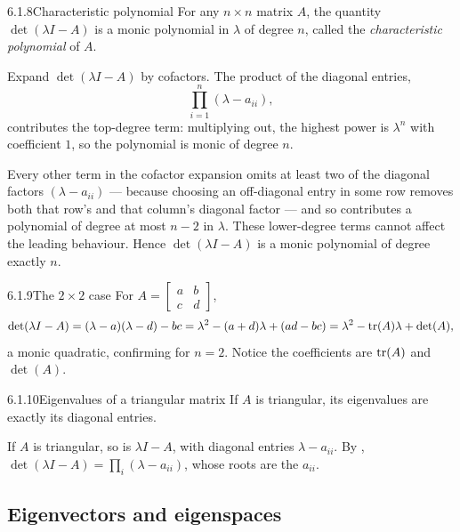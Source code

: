\begin{lems}{6.1.8}{Characteristic polynomial}
For any $n\times n$ matrix $A$, the quantity $\det(\lambda I-A)$ is a monic polynomial in $\lambda$ of degree $n$, called the \emph{characteristic polynomial} of $A$.
\end{lems}

\begin{prf}
Expand $\det(\lambda I-A)$ by cofactors. The product of the diagonal entries,
\[
\prod_{i=1}^n(\lambda-a_{ii}),
\]
contributes the top-degree term: multiplying out, the highest power is $\lambda^n$ with coefficient $1$, so the polynomial is monic of degree $n$.

Every other term in the cofactor expansion omits at least two of the diagonal factors $(\lambda-a_{ii})$ --- because choosing an off-diagonal entry in some row removes both that row's and that column's diagonal factor --- and so contributes a polynomial of degree at most $n-2$ in $\lambda$. These lower-degree terms cannot affect the leading behaviour. Hence $\det(\lambda I-A)$ is a monic polynomial of degree exactly $n$.
\end{prf}

\begin{exmp}{6.1.9}{The $2\times2$ case}
For $A=\left[\begin{smallmatrix}a&b\\c&d\end{smallmatrix}\right]$,
\[
\det(\lambda I-A)=(\lambda-a)(\lambda-d)-bc=\lambda^2-(a+d)\lambda+(ad-bc)=\lambda^2-\operatorname{tr}(A)\lambda+\det(A),
\]
a monic quadratic, confirming  for $n=2$. Notice the coefficients are $\operatorname{tr}(A)$ and $\det(A)$.
\end{exmp}

\begin{thms}{6.1.10}{Eigenvalues of a triangular matrix}
If $A$ is triangular, its eigenvalues are exactly its diagonal entries.
\end{thms}

\begin{prf}
If $A$ is triangular, so is $\lambda I-A$, with diagonal entries $\lambda-a_{ii}$. By , $\det(\lambda I-A)=\prod_{i}(\lambda-a_{ii})$, whose roots are the $a_{ii}$.
\end{prf}

\subsection{Eigenvectors and eigenspaces}


